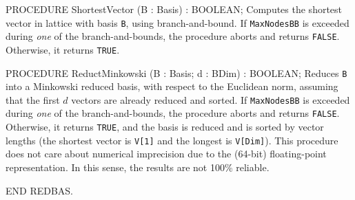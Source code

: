 PROCEDURE ShortestVector (B : Basis) : BOOLEAN;
\endcode
  \tab Computes the shortest vector in lattice with basis {\tt B},
   using branch-and-bound.
   If {\tt MaxNodesBB} is exceeded during {\em one} of the branch-and-bounds,
   the procedure aborts and returns {\tt FALSE}.
   Otherwise, it returns {\tt TRUE}.
\endtab
\code

PROCEDURE ReductMinkowski (B : Basis;  d : BDim) : BOOLEAN;
\endcode
   \tab  Reduces {\tt B} into a Minkowski reduced basis, with respect to the
   Euclidean norm, assuming
   that the first $d$ vectors are already reduced and sorted.
   If {\tt MaxNodesBB} is exceeded during {\em one} of the branch-and-bounds,
   the procedure aborts and returns {\tt FALSE}.
   Otherwise, it returns {\tt TRUE}, and the basis is reduced and
   is sorted by vector lengths (the shortest vector is {\tt V[1]} and
   the longest is {\tt V[Dim]}).
   This procedure does not care about numerical imprecision due to the
   (64-bit) floating-point representation.
   In this sense, the results are not 100\% reliable.
   \endtab
\code

END REDBAS.
\endcode


